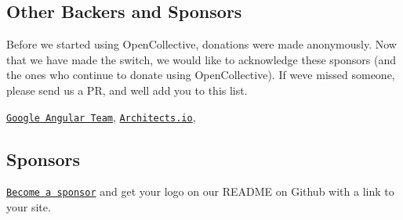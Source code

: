 \subsection*{Other Backers and Sponsors}

Before we started using Open\+Collective, donations were made anonymously. Now that we have made the switch, we would like to acknowledge these sponsors (and the ones who continue to donate using Open\+Collective). If we\textquotesingle{}ve missed someone, please send us a PR, and we\textquotesingle{}ll add you to this list.

\href{https://angular.io/}{\tt Google Angular Team}, \href{http://architects.io/}{\tt Architects.\+io}, \href{https://moonmail.io}{\tt } \href{https://monei.net}{\tt }

\subsection*{Sponsors}

\href{https://opencollective.com/webpack#sponsor}{\tt Become a sponsor} and get your logo on our R\+E\+A\+D\+ME on Github with a link to your site.

